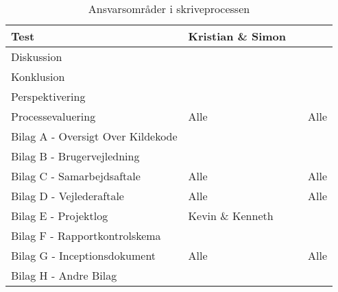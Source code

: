 \begin{table}[H]
\begin{tabularx}{\textwidth}{|p{7cm}|X|X|X|}
        \hline
        Test                                & Kristian \& Simon &  &  \\
        \hline
        Diskussion                          &  &  &  \\
        \hline
        Konklusion                          &  &  &  \\
        \hline
        Perspektivering                     &  &  &  \\
        \hline
        Processevaluering                   & Alle &  & Alle \\
        \hline
        Bilag A - Oversigt Over Kildekode   &  &  &  \\
        \hline
        Bilag B - Brugervejledning          &  &  &  \\
        \hline
        Bilag C - Samarbejdsaftale          & Alle &  & Alle\\
        \hline
        Bilag D - Vejlederaftale            & Alle &  & Alle\\
        \hline
        Bilag E - Projektlog                & Kevin \& Kenneth &  & \\
        \hline
        Bilag F - Rapportkontrolskema       &  &  &  \\
        \hline
        Bilag G - Inceptionsdokument        & Alle &  & Alle \\
        \hline
        Bilag H - Andre Bilag               &  &  &  \\
        \hline
    \end{tabularx}
    \caption{Ansvarsområder i skriveprocessen}
    \label{tab:redaktionelt}
\end{table}